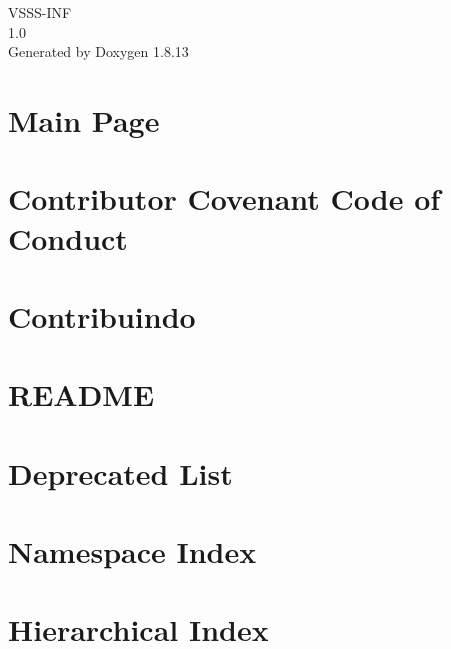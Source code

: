 \documentclass[twoside]{book}
\newcommand{\+}{\discretionary{\mbox{\scriptsize$\hookleftarrow$}}{}{}}
\newcommand{\clearemptydoublepage}{%
  \newpage{\pagestyle{empty}\cleardoublepage}%
}
\begin{document}
\hypersetup{pageanchor=false,
             bookmarksnumbered=true,
             pdfencoding=unicode
            }
\begin{titlepage}
\vspace*{7cm}
\begin{center}%
{\Large V\+S\+S\+S-\/\+I\+NF \\[1ex]\large 1.\+0 }\\
\vspace*{1cm}
{\large Generated by Doxygen 1.8.13}\\
\end{center}
\end{titlepage}
\clearemptydoublepage
{}
\tableofcontents
\clearemptydoublepage
{}
\hypersetup{pageanchor=true}

\chapter{Main Page}
\label{index}\hypertarget{index}{}
\chapter{Contributor Covenant Code of Conduct}
\label{md_docs__c_o_d_e__o_f__c_o_n_d_u_c_t}

\chapter{Contribuindo}
\label{md_docs__c_o_n_t_r_i_b_u_t_i_n_g}

\chapter{R\+E\+A\+D\+ME}
\label{md_docs__r_e_a_d_m_e_8en}

\chapter{Deprecated List}
\label{deprecated}

\chapter{Namespace Index}

\chapter{Hierarchical Index}

\end{document}
